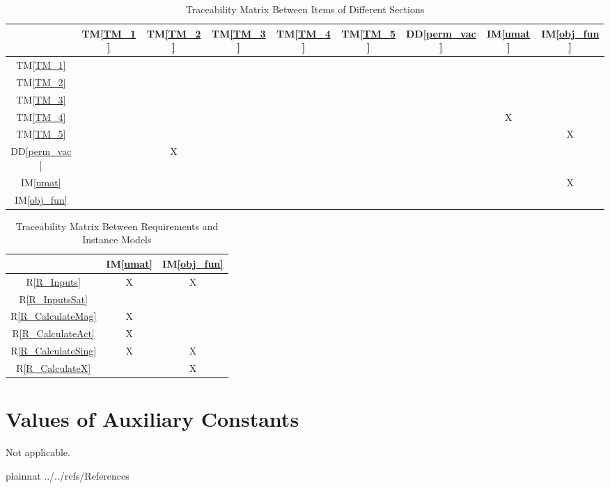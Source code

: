 \documentclass[12pt]{article}
\newcommand{\ddref}[1]{DD\ref{#1}}
\newcommand{\tref}[1]{TM\ref{#1}}
\newcommand{\iref}[1]{IM\ref{#1}}
\newcommand{\rref}[1]{R\ref{#1}}
\begin{document}
\begin{table}[h!]
\centering
\begin{tabular}{|c|c|c|c|c|c|c|c|c|}
\hline        
	& \tref{TM_1}& \tref{TM_2}& \tref{TM_3}& \tref{TM_4}& \tref{TM_5} & \ddref{perm_vac}& \iref{umat} & \iref{obj_fun} \\
\hline
\tref{TM_1}     & & & & & & & &  \\ \hline
\tref{TM_2}     & & & & & & & &  \\ \hline
\tref{TM_3}     & & & & & & & &  \\ \hline
\tref{TM_4}     & & & & & & &X &  \\ \hline
\tref{TM_5}      & & & & & & & &X  \\ \hline
\ddref{perm_vac} & &X & & & & & &  \\ \hline
\iref{umat}  & & & & & & & &X  \\ \hline
\iref{obj_fun}    & & & & & & & &  \\ 
\hline
\end{tabular}
\caption{Traceability Matrix Between Items of Different Sections}
\label{Table:trace}
\end{table}

\begin{table}[h!]
\centering
\begin{tabular}{|c|c|c|}
\hline
	& \iref{umat}& \iref{obj_fun} \\
\hline
\rref{R_Inputs}     &X &X \\ \hline
\rref{R_InputsSat}    & & \\ \hline
\rref{R_CalculateMag}   &X & \\ \hline
\rref{R_CalculateAct}     &X & \\ \hline 
\rref{R_CalculateSing}       &X &X \\ \hline
\rref{R_CalculateX}   & &X \\ 
\hline
\end{tabular}
\caption{Traceability Matrix Between Requirements and Instance Models}
\label{Table:R_trace}
\end{table}

\newpage

\section{Values of Auxiliary Constants}
Not applicable.

\newpage

 {plainnat}
 {../../refs/References}
\end{document}
